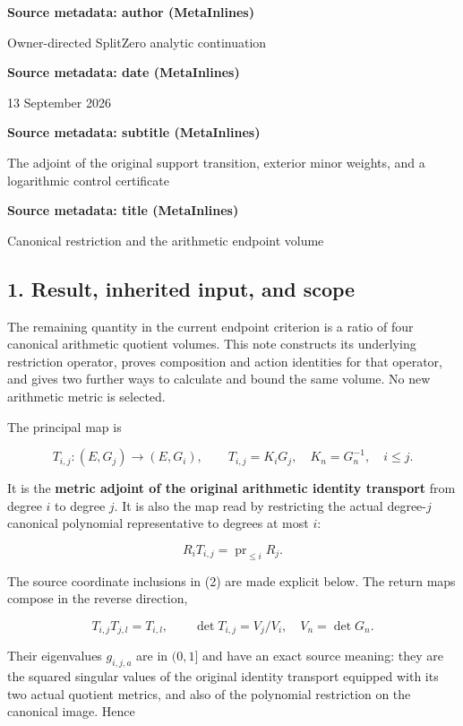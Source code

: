 \textbf{Source metadata: author (MetaInlines)}

Owner-directed SplitZero analytic continuation

\textbf{Source metadata: date (MetaInlines)}

13 September 2026

\textbf{Source metadata: subtitle (MetaInlines)}

The adjoint of the original support transition, exterior minor weights, and a logarithmic control certificate

\textbf{Source metadata: title (MetaInlines)}

Canonical restriction and the arithmetic endpoint volume

\subsection{1. Result, inherited input, and scope}\label{endpoint-restriction_original--result-inherited-input-and-scope}

The remaining quantity in the current endpoint criterion is a ratio of four canonical arithmetic quotient volumes. This note constructs its underlying restriction operator, proves composition and action identities for that operator, and gives two further ways to calculate and bound the same volume. No new arithmetic metric is selected.

The principal map is

\[
 T_{i,j}:(E,G_j)\longrightarrow(E,G_i),\qquad
 T_{i,j}=K_iG_j,\quad K_n=G_n^{-1},\quad i\le j.                 \tag{1}
\]

It is the \textbf{metric adjoint of the original arithmetic identity transport} from degree \(i\) to degree \(j\). It is also the map read by restricting the actual degree-\(j\) canonical polynomial representative to degrees at most \(i\):

\[
 R_iT_{i,j}=\operatorname{pr}_{\le i}R_j.                       \tag{2}
\]

The source coordinate inclusions in (2) are made explicit below. The return maps compose in the reverse direction,

\[
 T_{i,j}T_{j,l}=T_{i,l},\qquad
 \det T_{i,j}=V_j/V_i,\quad V_n=\det G_n.                        \tag{3}
\]

Their eigenvalues \(g_{i,j,a}\) are in \((0,1]\) and have an exact source meaning: they are the squared singular values of the original identity transport equipped with its two actual quotient metrics, and also of the polynomial restriction on the canonical image. Hence

